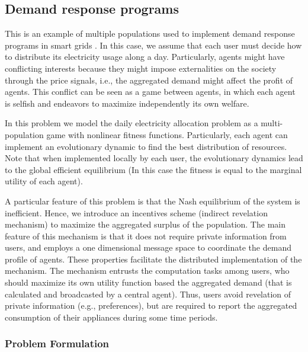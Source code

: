 \documentclass[a4paper,10pt]{article}
\begin{document}
 \FloatBarrier

\subsection{Demand response programs}

This is an example of multiple populations used to implement demand response programs in smart grids \cite{barreto2013design, barreto2014incentives}. In this case, we assume that each user must decide how to distribute its electricity usage along a day. Particularly, 
agents might have conflicting interests because they might impose externalities on the society through the price signals, i.e., the aggregated demand might affect the profit of agents. This conflict can be seen as a game between agents, in which each agent is selfish and  endeavors to maximize independently its own welfare. 

In this problem we model the daily electricity allocation problem as a multi-population game with nonlinear fitness functions. Particularly, each agent can implement an evolutionary dynamic to find the best distribution of resources. Note that when implemented locally by each user, the evolutionary dynamics lead to the global efficient equilibrium (In this case the fitness is equal to the marginal utility of each agent). 

A particular feature of this problem is that the Nash equilibrium of the system is inefficient. Hence, 
we introduce an incentives scheme (indirect revelation mechanism) to maximize the aggregated surplus of the population.
The main feature of this mechanism is that it does not require private information from users, and employs a one dimensional message space to coordinate the demand profile of agents. These properties facilitate the distributed implementation of the mechanism. The mechanism entrusts the computation tasks among users, who should maximize its own utility function based the aggregated demand (that is calculated and broadcasted by a central agent). Thus, users avoid revelation of private information (e.g., preferences), but are required to report the aggregated consumption of their appliances during some time periods.







\subsubsection{Problem Formulation}
\end{document}
